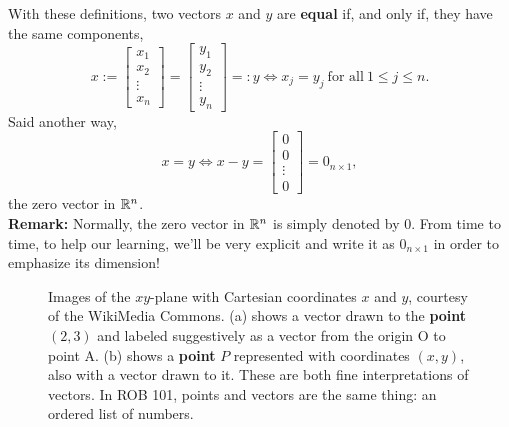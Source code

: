 With these definitions, two vectors $x$ and $y$ are \textbf{equal} if, and only if, they have the same components, 
$$x := \begin{bmatrix} x_1 \\ x_2 \\ \vdots \\ x_n\end{bmatrix} =  \begin{bmatrix} y_1 \\ y_2 \\ \vdots \\ y_n\end{bmatrix}=:y \iff x_j=y_j~\text{for all}~1 \le j \le n.$$ Said another way, 
$$x=y \iff x-y =  \begin{bmatrix} 0 \\ 0 \\ \vdots \\0 \end{bmatrix}=0_{n \times 1},$$
the zero vector in $\mathbb R^n$.\\

\textbf{Remark:} Normally, the zero vector in $\mathbb R^n$ is simply denoted by $0$. From time to time, to help our learning, we'll be very explicit and write it as $0_{n \times 1}$ in order to emphasize its dimension!




\begin{figure}[htb!]%
\centering
{}%
\hspace{20pt}%
%
\caption[]{Images of the $xy$-plane with Cartesian coordinates $x$ and $y$, courtesy of the WikiMedia Commons. (a) shows a vector drawn to the \textbf{point} $(2,3)$ and labeled suggestively as a vector from the origin O to point A. (b) shows a \textbf{point} $P$ represented with coordinates $(x,y)$, also with a vector drawn to it. These are both fine interpretations of vectors. In ROB 101, points and vectors are the same thing: an ordered list of numbers.}
    \label{fig:2Dvectors}
\end{figure}




